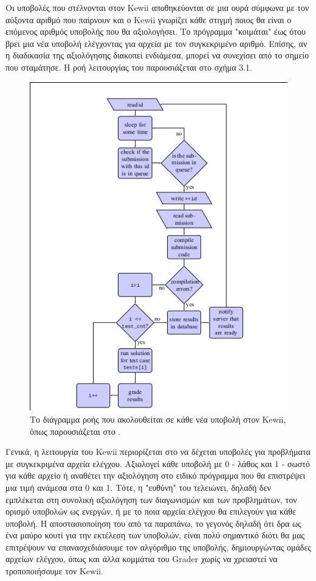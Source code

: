 \documentclass[diploma]{softlab-thesis}
\begin{document}
\bigskip

Οι υποβολές που στέλνονται στον Kewii αποθηκεύονται σε μια ουρά σύμφωνα με τον
αύξοντα αριθμό που παίρνουν και ο Kewii γνωρίζει κάθε στιγμή ποιος θα είναι ο
επόμενος αριθμός υποβολής που θα αξιολογήσει. Το πρόγραμμα "κοιμάται" έως ότου
βρει μια νέα υποβολή ελέγχοντας για αρχεία με τον συγκεκριμένο αριθμό. Επίσης,
αν η διαδικασία της αξιολόγησης διακοπεί ενδιάμεσα, μπορεί να συνεχίσει από το
σημείο που σταμάτησε. Η ροή λειτουργίας του παρουσιάζεται στο σχήμα 3.1.

\begin{figure}
  \centering
  \includegraphics[scale=0.8,trim=4 4 4 4,clip]{Figures/graderflow.png}
  \caption[Ροή Kewii]{Το διάγραμμα ροής που ακολουθείται σε κάθε νέα υποβολή
  στον Kewii, όπως παρουσιάζεται στο \cite{Tsiamitros}.}
\end{figure}

\bigskip

Γενικά, η λειτουργία του Kewii περιορίζεται στο να δέχεται υποβολές για
προβλήματα με συγκεκριμένα αρχεία ελέγχου. Αξιολογεί κάθε υποβολή με 0 - λάθος
και 1 - σωστό για κάθε αρχείο ή αναθέτει την αξιολόγηση στο ειδικό πρόγραμμα
που θα επιστρέψει μια τιμή ανάμεσα στα 0 και 1. Τότε, η "ευθύνη" του τελειώνει,
δηλαδή δεν εμπλέκεται στη συνολική αξιολόγηση των διαγωνισμών και των
προβλημάτων, τον ορισμό υποβολών ως ενεργών, ή με το ποια αρχεία ελέγχου θα
επιλεγούν για κάθε υποβολή. Η αποστασιοποίηση του από τα παραπάνω, το γεγονός
δηλαδή ότι δρα ως ένα μαύρο κουτί για την εκτέλεση των υποβολών, είναι πολύ
σημαντικό διότι θα μας επιτρέψουν να επανασχεδιάσουμε τον αλγόριθμο της
υποβολής, δημιουργώντας ομάδες αρχείων ελέγχου, όπως και άλλα κομμάτια του
Grader χωρίς να χρειαστεί να τροποποιήσουμε τον Kewii.
\end{document}
